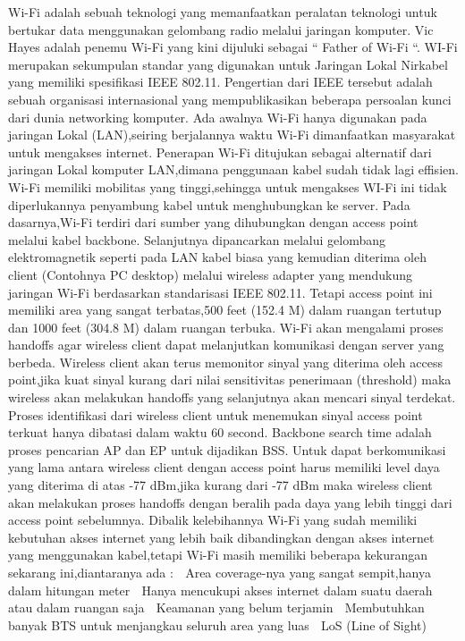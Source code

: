 Wi-Fi adalah sebuah teknologi yang memanfaatkan peralatan teknologi untuk bertukar data menggunakan gelombang radio melalui jaringan komputer. Vic Hayes adalah penemu Wi-Fi yang kini dijuluki sebagai “ Father of Wi-Fi “. WI-Fi merupakan sekumpulan standar yang digunakan untuk Jaringan Lokal Nirkabel yang memiliki spesifikasi IEEE 802.11. Pengertian dari IEEE tersebut adalah sebuah organisasi internasional yang mempublikasikan beberapa persoalan kunci dari dunia networking komputer. Ada awalnya Wi-Fi hanya digunakan pada jaringan Lokal (LAN),seiring berjalannya waktu Wi-Fi dimanfaatkan masyarakat untuk mengakses internet. Penerapan Wi-Fi  ditujukan sebagai alternatif dari jaringan Lokal komputer LAN,dimana penggunaan kabel sudah tidak lagi effisien. Wi-Fi memiliki mobilitas yang tinggi,sehingga untuk mengakses WI-Fi ini tidak diperlukannya penyambung kabel untuk menghubungkan ke server.
Pada dasarnya,Wi-Fi terdiri dari sumber yang dihubungkan dengan access point melalui kabel backbone. Selanjutnya dipancarkan melalui gelombang elektromagnetik seperti pada LAN kabel biasa yang kemudian diterima oleh client (Contohnya PC desktop) melalui wireless adapter yang mendukung jaringan Wi-Fi berdasarkan standarisasi IEEE 802.11. Tetapi access point ini memiliki area yang sangat terbatas,500 feet (152.4 M) dalam ruangan tertutup dan 1000 feet (304.8 M) dalam ruangan terbuka.
Wi-Fi akan mengalami proses handoffs agar wireless client dapat melanjutkan komunikasi dengan server yang berbeda. Wireless client akan terus memonitor sinyal yang diterima oleh access point,jika kuat sinyal kurang dari nilai sensitivitas penerimaan (threshold) maka wireless akan melakukan handoffs yang selanjutnya akan mencari sinyal terdekat. Proses identifikasi dari wireless client untuk menemukan sinyal access point terkuat hanya dibatasi dalam waktu 60 second. Backbone search time adalah proses pencarian AP dan EP untuk dijadikan BSS. Untuk dapat berkomunikasi yang lama antara wireless client dengan access point harus memiliki level daya yang diterima di atas -77 dBm,jika kurang dari -77 dBm maka wireless client akan melakukan proses handoffs dengan beralih pada daya yang lebih tinggi dari access point sebelumnya.
Dibalik kelebihannya Wi-Fi yang sudah memiliki kebutuhan  akses internet yang lebih baik dibandingkan dengan akses internet yang menggunakan kabel,tetapi Wi-Fi masih memiliki beberapa kekurangan sekarang ini,diantaranya ada :
	Area coverage-nya yang sangat sempit,hanya dalam hitungan meter
	Hanya mencukupi akses internet dalam suatu daerah atau dalam ruangan saja
	Keamanan yang belum terjamin
	Membutuhkan banyak BTS untuk menjangkau seluruh area yang luas
	LoS (Line of Sight)



